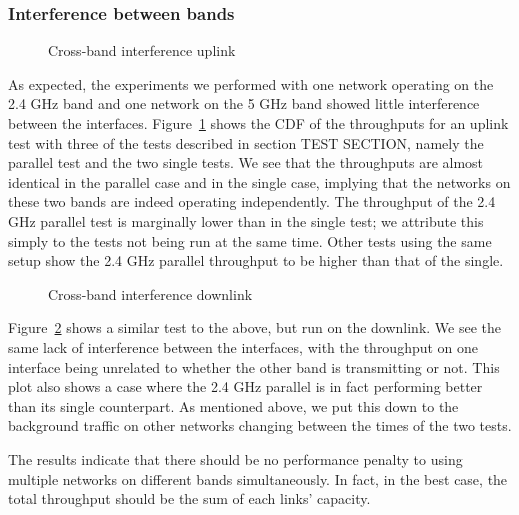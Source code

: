
\subsubsection{Interference between bands}

\begin{figure}[h]
 \centering
 
 \caption{Cross-band interference uplink}\label{graph:cb-interference-up}
\end{figure}

As expected, the experiments we performed with one network operating on the 2.4
GHz band and one network on the 5 GHz band showed little interference between
the interfaces.  Figure~\ref{graph:cb-interference-up} shows the CDF of the
throughputs for an uplink test with three of the tests described in section TEST
SECTION, namely the parallel test and the two single tests. We see that the    %
throughputs are almost identical in the parallel case and in the single case,
implying that the networks on these two bands are indeed operating
independently. The throughput of the 2.4 GHz parallel test is marginally lower
than in the single test; we attribute this simply to the tests not being run at
the same time. Other tests using the same setup show the 2.4 GHz parallel
throughput to be higher than that of the single.

\begin{figure}[h]
 \centering
 
 \caption{Cross-band interference downlink}\label{graph:cb-interference-down}
\end{figure}


Figure~\ref{graph:cb-interference-down} shows a similar test to the above, but
run on the downlink. We see the same lack of interference between the
interfaces, with the throughput on one interface being unrelated to whether the
other band is transmitting or not. This plot also shows a case where the 2.4 GHz
parallel is in fact performing better than its single counterpart. As mentioned
above, we put this down to the background traffic on other networks changing
between the times of the two tests.

The results indicate that there should be no performance penalty to using
multiple networks on different bands simultaneously. In fact, in the best case,
the total throughput should be the sum of each links' capacity.

